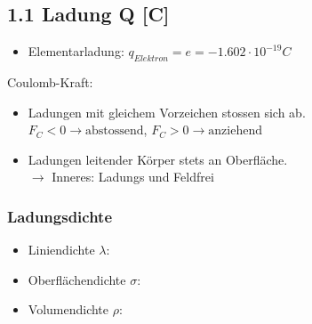 \subsection*{1.1 Ladung Q [C]}

\begin{itemize}
    \item Elementarladung: $q_{Elektron} = e = - 1.602 \cdot 10^{-19}C$
\end{itemize}

Coulomb-Kraft: 

\begin{itemize}
    \item Ladungen mit gleichem Vorzeichen stossen sich ab.
    \\$F_C<0 \rightarrow \text{abstossend}$,
    $F_C>0 \rightarrow \text{anziehend}$
    \item Ladungen leitender Körper stets an Oberfläche.\\
    $\rightarrow$ Inneres: Ladungs und Feldfrei
\end{itemize}

\subsubsection*{Ladungsdichte}

\begin{itemize}
    \item Liniendichte $\lambda$: 
    \item Oberflächendichte $\sigma$: 
    \item Volumendichte $\rho$: 
\end{itemize}

